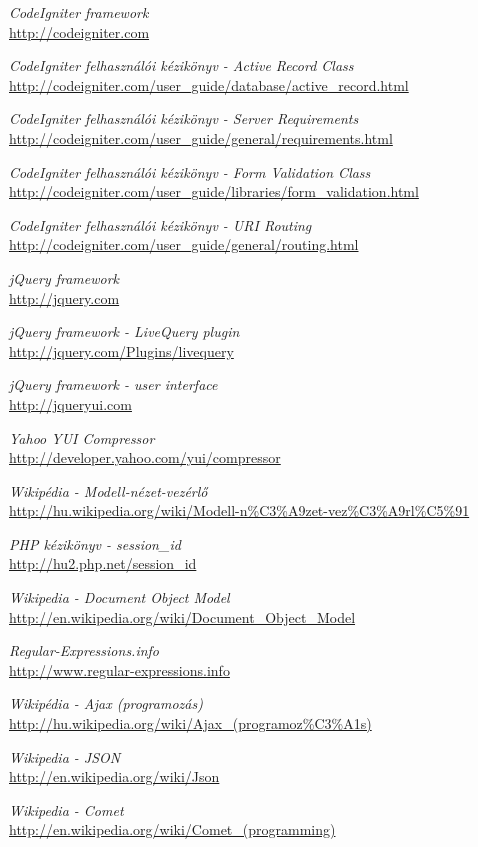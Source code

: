 \documentclass[12pt,a4paper,twoside]{article}
\begin{document}
\clearpage
{}
{}
\begin{thebibliography}{99}

  \emph{CodeIgniter framework}\\
  \url{http://codeigniter.com}

  \emph{CodeIgniter felhasználói kézikönyv - Active Record Class}\\
  \url{http://codeigniter.com/user_guide/database/active_record.html}

  \emph{CodeIgniter felhasználói kézikönyv - Server Requirements}\\
  \url{http://codeigniter.com/user_guide/general/requirements.html}

  \emph{CodeIgniter felhasználói kézikönyv - Form Validation Class}\\
  \url{http://codeigniter.com/user_guide/libraries/form_validation.html}

  \emph{CodeIgniter felhasználói kézikönyv - URI Routing}\\
  \url{http://codeigniter.com/user_guide/general/routing.html}

  \emph{jQuery framework}\\
  \url{http://jquery.com}

  \emph{jQuery framework - LiveQuery plugin}\\
  \url{http://jquery.com/Plugins/livequery}

  \emph{jQuery framework - user interface}\\
  \url{http://jqueryui.com}

  \emph{Yahoo YUI Compressor}\\
  \url{http://developer.yahoo.com/yui/compressor}

  \emph{Wikipédia - Modell-nézet-vezérlő}\\
  \url{http://hu.wikipedia.org/wiki/Modell-n\%C3\%A9zet-vez\%C3\%A9rl\%C5\%91}

  \emph{PHP kézikönyv - session\_id}\\
  \url{http://hu2.php.net/session_id}

  \emph{Wikipedia - Document Object Model}\\
  \url{http://en.wikipedia.org/wiki/Document_Object_Model}

  \emph{Regular-Expressions.info}\\
  \url{http://www.regular-expressions.info}

  \emph{Wikipédia - Ajax (programozás)}\\
  \url{http://hu.wikipedia.org/wiki/Ajax_(programoz\%C3\%A1s)}

  \emph{Wikipedia - JSON}\\
  \url{http://en.wikipedia.org/wiki/Json}

  \emph{Wikipedia - Comet}\\
  \url{http://en.wikipedia.org/wiki/Comet_(programming)}

\end{thebibliography}
\end{document}
